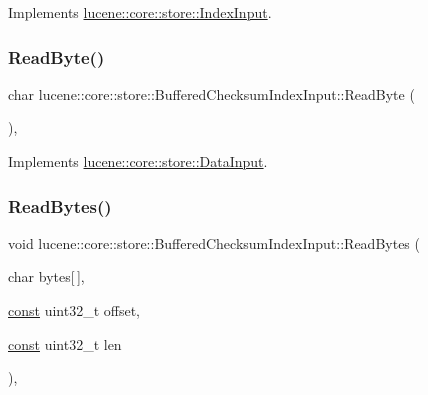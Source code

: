 Implements \mbox{\hyperlink{classlucene_1_1core_1_1store_1_1IndexInput_a220f07064bf89579cbb5f8e5aeb3707d}{lucene\+::core\+::store\+::\+Index\+Input}}.

\mbox{\label{classlucene_1_1core_1_1store_1_1BufferedChecksumIndexInput_acbb041afa162556f78073457a4e790f3}} 
\subsubsection{\texorpdfstring{Read\+Byte()}{ReadByte()}}
{\footnotesize\ttfamily char lucene\+::core\+::store\+::\+Buffered\+Checksum\+Index\+Input\+::\+Read\+Byte (\begin{DoxyParamCaption}{ }\end{DoxyParamCaption})\hspace{0.3cm}{\ttfamily [inline]}, {\ttfamily [virtual]}}



Implements \mbox{\hyperlink{classlucene_1_1core_1_1store_1_1DataInput_a60f2550ccbe4decde30f3773dc53c0ef}{lucene\+::core\+::store\+::\+Data\+Input}}.

\mbox{\label{classlucene_1_1core_1_1store_1_1BufferedChecksumIndexInput_a99c8cadcd9bdde48bd22144bc1829baf}} 
\subsubsection{\texorpdfstring{Read\+Bytes()}{ReadBytes()}}
{\footnotesize\ttfamily void lucene\+::core\+::store\+::\+Buffered\+Checksum\+Index\+Input\+::\+Read\+Bytes (\begin{DoxyParamCaption}\item[{char}]{bytes\mbox{[}$\,$\mbox{]},  }\item[{\mbox{\hyperlink{ZlibCrc32_8h_a2c212835823e3c54a8ab6d95c652660e}{const}} uint32\+\_\+t}]{offset,  }\item[{\mbox{\hyperlink{ZlibCrc32_8h_a2c212835823e3c54a8ab6d95c652660e}{const}} uint32\+\_\+t}]{len }\end{DoxyParamCaption})\hspace{0.3cm}{\ttfamily [inline]}, {\ttfamily [virtual]}}



